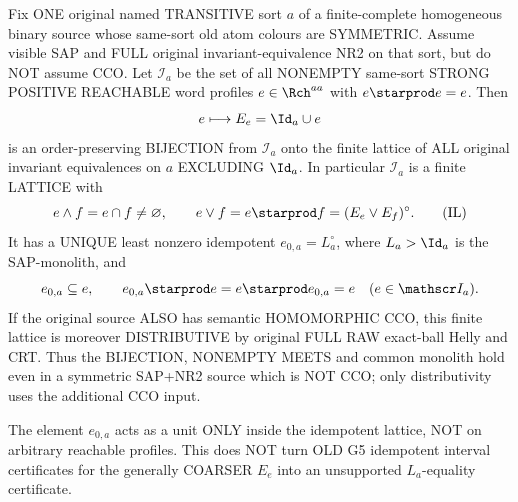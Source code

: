 \begin{lemma}
\label{lem:typed-strong-idempotent-lattice-monolith}
Fix ONE original named TRANSITIVE sort $a$
of a finite-complete homogeneous
binary source whose same-sort old
atom colours are SYMMETRIC.
Assume visible SAP and FULL
original invariant-equivalence NR2
on that sort, but do NOT assume CCO.
Let $\mathscr I_a$ be the set
of all NONEMPTY same-sort
STRONG POSITIVE REACHABLE
word profiles
$e\in\Rch^{aa}$ with
$e\starprod e=e$.
Then
\[
                  e\longmapsto
                    E_e=\Id_a\cup e
\]
is an order-preserving BIJECTION
from $\mathscr I_a$ onto the
finite lattice of ALL original
invariant equivalences
on $a$ EXCLUDING $\Id_a$.
In particular $\mathscr I_a$
is a finite LATTICE with
\[
  e\wedge f=e\cap f\ne\varnothing,
  \qquad
  e\vee f=e\starprod f
             =(E_e\vee E_f)^\circ .
 \tag{IL}\label{eq:typed-strong-idempotent-lattice}
\]
It has a UNIQUE least nonzero
idempotent $e_{0,a}=L_a^\circ$,
where $L_a>\Id_a$ is the
SAP-monolith, and
\[
       e_{0,a}\subseteq e,\qquad
       e_{0,a}\starprod e
                   =e\starprod e_{0,a}=e
       \quad(e\in\mathscr I_a).
\]
If the original source ALSO has
semantic HOMOMORPHIC CCO,
this finite lattice is moreover
DISTRIBUTIVE by original FULL
RAW exact-ball Helly and CRT.
Thus the BIJECTION, NONEMPTY
MEETS and common monolith
hold even in a symmetric
SAP+NR2 source which is
NOT CCO; only distributivity
uses the additional CCO input.

The element $e_{0,a}$ acts as
a unit ONLY inside the
idempotent lattice, NOT on
arbitrary reachable profiles.
This does NOT turn OLD G5
idempotent interval certificates
for the generally COARSER
$E_e$ into an unsupported
$L_a$-equality certificate.
\end{lemma}
